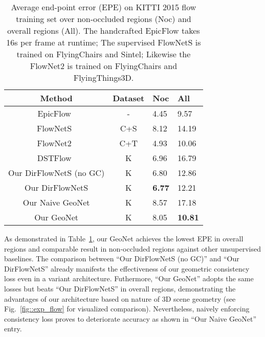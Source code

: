 \documentclass[10pt,twocolumn,letterpaper]{article}
\begin{document}
\begin{table}
\begin{center}
\setlength{\tabcolsep}{5.0pt}
\begin{tabular*}{1.0\linewidth}{c|c|p{1.1cm}<{\centering}|p{1.1cm}<{\centering}}
\toprule
Method & Dataset & Noc & All \\
\hline
EpicFlow~\cite{revaud2015epicflow} & - & 4.45 & 9.57 \\
FlowNetS~\cite{FischerDIHHGSCB15} & C+S & 8.12 & 14.19 \\
FlowNet2~\cite{IMKDB17} & C+T & 4.93 & 10.06 \\
\hline
DSTFlow~\cite{Ren2017UnsupervisedDL} & K & 6.96 & 16.79 \\
Our DirFlowNetS (no GC) & K & 6.80 & 12.86  \\
Our DirFlowNetS & K & \bf{6.77} & 12.21  \\
Our Naive GeoNet & K & 8.57 & 17.18  \\
Our GeoNet & K & 8.05 & \bf{10.81}  \\
\bottomrule
\end{tabular*}
\end{center}
\caption{Average end-point error (EPE) on KITTI 2015 flow training set over non-occluded regions (Noc) and overall regions (All). The handcrafted EpicFlow takes 16s per frame at runtime; The supervised FlowNetS is trained on FlyingChairs and Sintel; Likewise the FlowNet2 is trained on FlyingChairs and FlyingThings3D.}
\label{tab::flow}
\vspace{-3ex}
\end{table}%
As demonstrated in Table~\ref{tab::flow}, our GeoNet achieves the lowest EPE in overall regions and comparable result in non-occluded regions against other unsupervised baselines. 
The comparison between ``Our DirFlowNetS (no GC)'' and ``Our DirFlowNetS'' already manifests the effectiveness of our geometric consistency loss even in a variant architecture. Futhermore, ``Our GeoNet'' adopts the same losses but beats ``Our DirFlowNetS'' in overall regions, demonstrating the advantages of our architecture based on nature of 3D scene geometry (see Fig.~\ref{fig::exp_flow} for visualized comparison). 
Nevertheless, naively enforcing consistency loss proves to deteriorate accuracy %
as shown in ``Our Naive GeoNet'' entry. 
\end{document}
